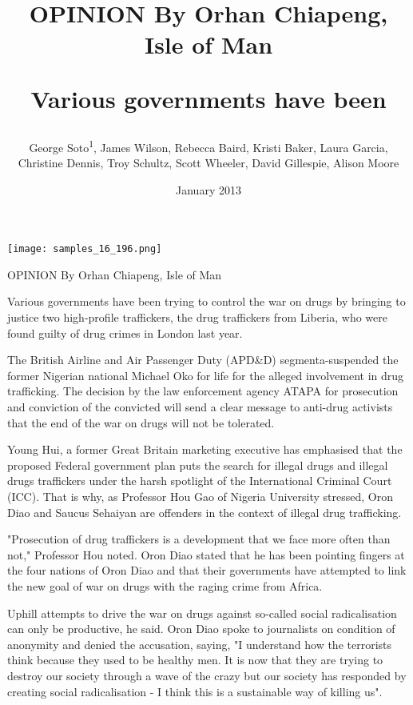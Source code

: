 \documentclass{article}
\title{OPINION By Orhan Chiapeng, Isle of Man

Various governments have been}
\author{George Soto\textsuperscript{1},  James Wilson,  Rebecca Baird,  Kristi Baker,  Laura Garcia,  Christine Dennis,  Troy Schultz,  Scott Wheeler,  David Gillespie,  Alison Moore}
\affil{\textsuperscript{1}Daniel & Daisy Novel Therapeutics Ltd.}
\date{January 2013}
\begin{document}
\maketitle

\begin{center}
\begin{minipage}{0.75\linewidth}
\texttt{[image: samples\_16\_196.png]}
\end{minipage}
\end{center}

OPINION By Orhan Chiapeng, Isle of Man

Various governments have been trying to control the war on drugs by bringing to justice two high-profile traffickers, the drug traffickers from Liberia, who were found guilty of drug crimes in London last year.

The British Airline and Air Passenger Duty (APD\&D) segmenta-suspended the former Nigerian national Michael Oko for life for the alleged involvement in drug trafficking. The decision by the law enforcement agency ATAPA for prosecution and conviction of the convicted will send a clear message to anti-drug activists that the end of the war on drugs will not be tolerated.

Young Hui, a former Great Britain marketing executive has emphasised that the proposed Federal government plan puts the search for illegal drugs and illegal drugs traffickers under the harsh spotlight of the International Criminal Court (ICC). That is why, as Professor Hou Gao of Nigeria University stressed, Oron Diao and Saucus Sehaiyan are offenders in the context of illegal drug trafficking.

"Prosecution of drug traffickers is a development that we face more often than not," Professor Hou noted. Oron Diao stated that he has been pointing fingers at the four nations of Oron Diao and that their governments have attempted to link the new goal of war on drugs with the raging crime from Africa.

Uphill attempts to drive the war on drugs against so-called social radicalisation can only be productive, he said. Oron Diao spoke to journalists on condition of anonymity and denied the accusation, saying, "I understand how the terrorists think because they used to be healthy men. It is now that they are trying to destroy our society through a wave of the crazy but our society has responded by creating social radicalisation - I think this is a sustainable way of killing us".
\end{document}
